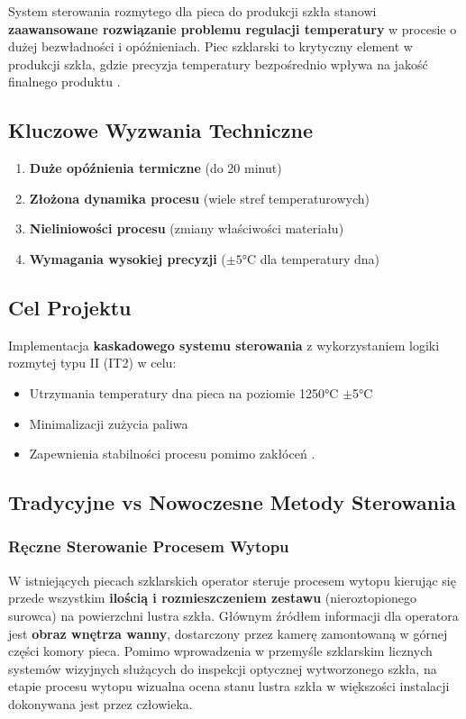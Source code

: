 \documentclass[12pt,a4paper]{article}
\begin{document}
System sterowania rozmytego dla pieca do produkcji szkła stanowi \textbf{zaawansowane rozwiązanie problemu regulacji temperatury} w procesie o dużej bezwładności i opóźnieniach. Piec szklarski to krytyczny element w produkcji szkła, gdzie precyzja temperatury bezpośrednio wpływa na jakość finalnego produktu \cite{lee-it2-furnace}.

\subsection{Kluczowe Wyzwania Techniczne}

\begin{enumerate}
    \item \textbf{Duże opóźnienia termiczne} (do 20 minut)
    \item \textbf{Złożona dynamika procesu} (wiele stref temperaturowych)
    \item \textbf{Nieliniowości procesu} (zmiany właściwości materiału)
    \item \textbf{Wymagania wysokiej precyzji} ($\pm5$°C dla temperatury dna)
\end{enumerate}

\subsection{Cel Projektu}

Implementacja \textbf{kaskadowego systemu sterowania} z wykorzystaniem logiki rozmytej typu II (IT2) w celu:
\begin{itemize}
    \item Utrzymania temperatury dna pieca na poziomie 1250°C $\pm$5°C
    \item Minimalizacji zużycia paliwa
    \item Zapewnienia stabilności procesu pomimo zakłóceń \cite{lee-it2-furnace}.
\end{itemize}

\subsection{Tradycyjne vs Nowoczesne Metody Sterowania}

\subsubsection{Ręczne Sterowanie Procesem Wytopu}

W istniejących piecach szklarskich operator steruje procesem wytopu kierując się przede wszystkim \textbf{ilością i rozmieszczeniem zestawu} (nieroztopionego surowca) na powierzchni lustra szkła. Głównym źródłem informacji dla operatora jest \textbf{obraz wnętrza wanny}, dostarczony przez kamerę zamontowaną w górnej części komory pieca. Pomimo wprowadzenia w przemyśle szklarskim licznych systemów wizyjnych służących do inspekcji optycznej wytworzonego szkła, na etapie procesu wytopu wizualna ocena stanu lustra szkła w większości instalacji dokonywana jest przez człowieka.
\end{document}
